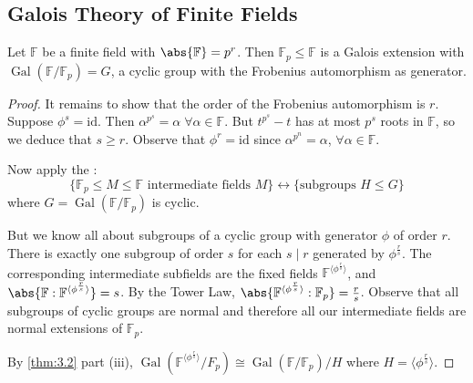 \documentclass{article}
\DeclareMathOperator{\Gal}{Gal}
\newcommand{\F}{\mathbb{F}}
\begin{document}
\subsection{Galois Theory of Finite Fields}






















\begin{nthm}\label{thm:3.16}
    Let $\F$ be a finite field with $\abs{\F} = p^r$.
    Then $\F_p \leq \F$ is a Galois extension with $\Gal(\F/\F_p) = G$, a cyclic group with the Frobenius automorphism as generator.
\end{nthm}
\begin{proof}
    It remains to show that the order of the Frobenius automorphism is $r$.
    Suppose $\phi^s = \mathrm{id}$.
    Then $\alpha^{p^s} = \alpha \; \forall \alpha \in \F$.
    But $t^{p^s} - t$ has at most $p^s$ roots in $\F$, so we deduce that $s \geq r$.
    Observe that $\phi^r = \mathrm{id}$ since $\alpha^{p^n} = \alpha$, $\forall \alpha \in \F$.

    Now apply the :
    \begin{equation*}
        \{\F_p \leq M \leq \F \text{ intermediate fields } M\} \longleftrightarrow \{\text{subgroups } H \leq G\}
    \end{equation*}
    where $G = \Gal(\F/\F_p)$ is cyclic.

    But we know all about subgroups of a cyclic group with generator $\phi$ of order $r$.
    There is exactly one subgroup of order $s$ for each $s \mid r$ generated by $\phi^\frac{r}{s}$.
    The corresponding intermediate subfields are the fixed fields $\F^{\langle \phi^\frac{r}{s} \rangle}$, and $\abs{\F:\F^{\langle \phi^\frac{r}{s} \rangle}} = s$.
    By the Tower Law, $\abs{\F^{\langle \phi^\frac{r}{s} \rangle}:\F_p} = \frac{r}{s}$.
    Observe that all subgroups of cyclic groups are normal and therefore all our intermediate fields are normal extensions of $\F_p$.

    By \cref{thm:3.2} part (iii), $\Gal(\F^{\langle \phi^\frac{r}{s} \rangle}/F_p) \cong \Gal(\F/\F_p) / H$ where $H = \langle \phi^\frac{r}{s} \rangle$.
\end{proof}
\end{document}
